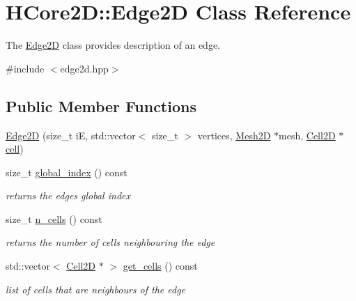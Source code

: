 \hypertarget{classHCore2D_1_1Edge2D}{}\section{H\+Core2D\+:\+:Edge2D Class Reference}
\label{classHCore2D_1_1Edge2D}


The \hyperlink{classHCore2D_1_1Edge2D}{Edge2D} class provides description of an edge.  




{\ttfamily \#include $<$edge2d.\+hpp$>$}

\subsection*{Public Member Functions}
\begin{DoxyCompactItemize}
\item 
\hyperlink{classHCore2D_1_1Edge2D_af3b982ed5bedc795c29e621a675a9137}{Edge2D} (size\+\_\+t iE, std\+::vector$<$ size\+\_\+t $>$ vertices, \hyperlink{classHCore2D_1_1Mesh2D}{Mesh2D} $\ast$mesh, \hyperlink{classHCore2D_1_1Cell2D}{Cell2D} $\ast$\hyperlink{classHCore2D_1_1Edge2D_aec9ba58af7a02bd31c4275edde79b5c6}{cell})
\item 
size\+\_\+t \hyperlink{group__Mesh2D_ga9561c126c9fdd05c342cceab997348e5}{global\+\_\+index} () const
\begin{DoxyCompactList}\small\item\em returns the edges global index \end{DoxyCompactList}\item 
size\+\_\+t \hyperlink{group__Mesh2D_gaca42f8179695c1ee3dd78bf1ff1c45c4}{n\+\_\+cells} () const
\begin{DoxyCompactList}\small\item\em returns the number of cells neighbouring the edge \end{DoxyCompactList}\item 
\mbox{\label{classHCore2D_1_1Edge2D_a7a4eb7fa6572d552cd5056237d770bdf}} 
std\+::vector$<$ \hyperlink{classHCore2D_1_1Cell2D}{Cell2D} $\ast$ $>$ \hyperlink{classHCore2D_1_1Edge2D_a7a4eb7fa6572d552cd5056237d770bdf}{get\+\_\+cells} () const
\begin{DoxyCompactList}\small\item\em list of cells that are neighbours of the edge \end{DoxyCompactList}\item 

\end{DoxyCompactItemize}
